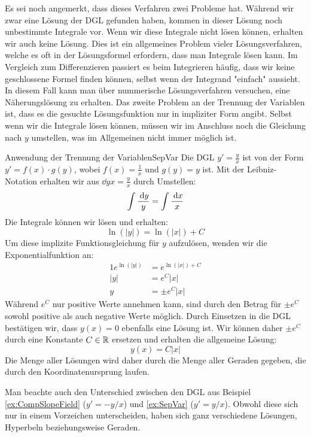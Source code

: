 Es sei noch angemerkt, dass dieses Verfahren zwei Probleme hat. Während wir zwar eine Lösung der DGL gefunden haben, kommen in dieser Lösung noch unbestimmte Integrale vor. Wenn wir diese Integrale nicht lösen können, erhalten wir auch keine Lösung. Dies ist ein allgemeines Problem vieler Lösungsverfahren, welche es oft in der Lösungsformel erfordern, dass man Integrale lösen kann. Im Vergleich zum Differenzieren passiert es beim Integrieren häufig, dass wir keine geschlossene Formel finden können, selbst wenn der Integrand "einfach" aussieht. In diesem Fall kann man über nummerische Lösungsverfahren versuchen, eine Näherungslösung zu erhalten. Das zweite Problem an der Trennung der Variablen ist, dass es die gesuchte Lösungsfunktion nur in impliziter Form angibt. Selbst wenn wir die Integrale lösen können, müssen wir im Anschluss noch die Gleichung nach $y$ umstellen, was im Allgemeinen nicht immer möglich ist.

\begin{example}{Anwendung der Trennung der Variablen}{SepVar}
    Die DGL $y'=\frac{y}{x}$ ist von der Form $y' = f(x) \cdot g(y)$, wobei $f(x)=\frac{1}{x}$ und $g(y)=y$ ist. Mit der Leibniz-Notation erhalten wir aus $\dd{y}{x} = \frac{y}{x}$ durch Umstellen:
    $$
        \int \frac{\:\mathrm{d}{y}}{y} = \int \frac{\:\mathrm{d}{x}}{x}
    $$
    Die Integrale können wir lösen und erhalten:
    $$
        \ln(|y|) = \ln(|x|) + C
    $$
    Um diese implizite Funktionsgleichung für $y$ aufzulösen, wenden wir die Exponentialfunktion an:
    \begin{alignat}{1}
        e^{\ln(|y|)} &= e^{\ln(|x|) + C} \\
        |y|          &= e^C |x| \\
        y            &= \pm e^C |x|
    \end{alignat}
    Während $e^C$ nur positive Werte annehmen kann, sind durch den Betrag für $\pm e^C$ sowohl positive als auch negative Werte möglich. Durch Einsetzen in die DGL bestätigen wir, dass $y(x) =0$ ebenfalls eine Lösung ist. Wir können daher $\pm e^C$ durch eine Konstante $C\in\mathbb{R}$ ersetzen und erhalten die allgemeine Lösung:
    $$
        y(x) = C |x|
    $$
    Die Menge aller Lösungen wird daher durch die Menge aller Geraden gegeben, die durch den Koordinatenursprung laufen.
\end{example}

Man beachte auch den Unterschied zwischen den DGL aus Beispiel \ref{ex:CompSlopeField} ($y'=-y/x$) und \ref{ex:SepVar} ($y'=y/x$). Obwohl diese sich nur in einem Vorzeichen unterscheiden, haben sich ganz verschiedene Lösungen, Hyperbeln beziehungsweise Geraden.

